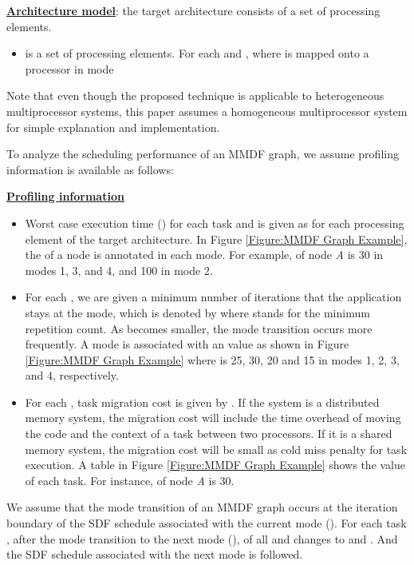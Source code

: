 \documentclass[prodmode,acmtecs]{acmsmall}
\begin{document}
\textbf{\underline{Architecture model}}: the target architecture consists of a set of processing elements.

\begin{itemize}
  \item  is a set of processing elements. For each  and ,  where  is mapped onto a processor  in mode 
\end{itemize}

Note that even though the proposed technique is applicable to heterogeneous multiprocessor systems, this paper assumes a homogeneous multiprocessor system for simple explanation and implementation.

To analyze the scheduling performance of an MMDF graph, we assume profiling information is available as follows:

\vspace{0.3cm}

\textbf{\underline{Profiling information}}

\begin{itemize}
  \item Worst case execution time () for each task  and  is given as  for each processing element  of the target architecture. In Figure \ref{Figure:MMDF Graph Example}, the  of a node is annotated in each mode. For example,  of node \textit{A} is 30 in modes 1, 3, and 4, and 100 in mode 2.
  \vspace{0.2cm}
  \item For each , we are given a minimum number of iterations that the application stays at the mode, which is denoted by  where  stands for the minimum repetition count. As  becomes smaller, the mode transition occurs more frequently. A mode is associated with an  value as shown in Figure \ref{Figure:MMDF Graph Example} where  is 25, 30, 20 and 15 in modes 1, 2, 3, and 4, respectively.
  \vspace{0.2cm}
  \item For each , task migration cost is given by . If the system is a distributed memory system, the migration cost will include the time overhead of moving the code and the context of a task between two processors. If it is a shared memory system, the migration cost will be small as cold miss penalty for task execution. A table in Figure \ref{Figure:MMDF Graph Example} shows the  value of each task. For instance,  of node \textit{A} is 30. 
\end{itemize}

We assume that the mode transition of an MMDF graph occurs at the iteration boundary of the SDF schedule associated with the current mode (). For each task , after the mode transition to the next mode (),  of all  and  changes to  and . And the SDF schedule associated with the next mode is followed.
\end{document}
